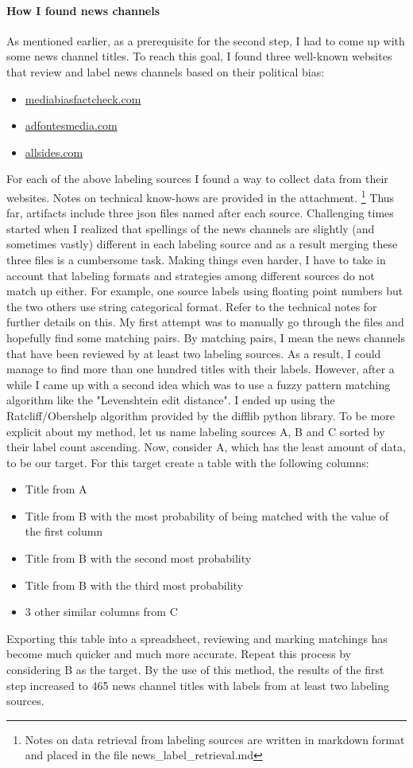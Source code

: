 \documentclass[11pt]{article}
\begin{document}
\paragraph{How I found news channels}
As mentioned earlier, as a prerequisite for the second step, I had to come up with some news channel titles. To reach this goal, I found three well-known websites that review and label news channels based on their political bias: 
\begin{itemize}
\item \url{mediabiasfactcheck.com}
\item \url{adfontesmedia.com}
\item \url{allsides.com}
\end{itemize}
For each of the above labeling sources I found a way to collect data from their websites. Notes on technical know-hows are provided in the attachment. \footnote{Notes on data retrieval from labeling sources are written in markdown format and placed in the file news\_label\_retrieval.md}
Thus far, artifacts include three json files named after each source. Challenging times started when I realized that spellings of the news channels are slightly (and sometimes vastly) different in each labeling source and as a result merging these three files is a cumbersome task. Making things even harder, I have to take in account that labeling formats and strategies among different sources do not match up either. For example, one source labels using floating point numbers but the two others use string categorical format. Refer to the technical notes for further details on this. My first attempt was to manually go through the files and hopefully find some matching pairs. By matching pairs, I mean the news channels that have been reviewed by at least two labeling sources. As a result, I could manage to find more than one hundred titles with their labels. However, after a while I came up with a second idea which was to use a fuzzy pattern matching algorithm like the "Levenshtein edit distance". I ended up using the Ratcliff/Obershelp algorithm provided by the difflib python library. To be more explicit about my method, let us name labeling sources A, B and C sorted by their label count ascending. Now, consider A, which has the least amount of data, to be our target. For this target create a table with the following columns:
\begin{itemize}
  \item Title from A
  \item Title from B with the most probability of being matched with the value of the first column
  \item Title from B with the second most probability
  \item Title from B with the third most probability
  \item 3 other similar columns from C
\end{itemize}
Exporting this table into a spreadsheet, reviewing and marking matchings has become much quicker and much more accurate. Repeat this process by considering B as the target. By the use of this method, the results of the first step increased to 465 news channel titles with labels from at least two labeling sources.
\end{document}
